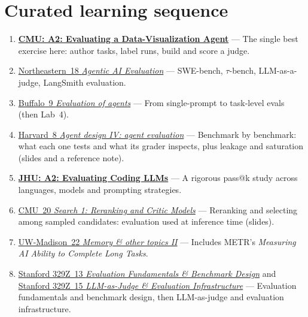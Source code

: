 \documentclass[10pt,oneside]{report}
\begin{document}
\section{Curated learning sequence}
\begin{enumerate}
\item \hyperlink{asg-CMU-2}{\textbf{CMU: A2: Evaluating a Data-Visualization Agent}} --- The single best exercise here: author tasks, label runs, build and score a judge.
\item \hyperlink{lec-NEU-18}{Northeastern~18 \emph{Agentic AI Evaluation}} --- SWE-bench, $\tau$-bench, LLM-as-a-judge, LangSmith evaluation.
\item \hyperlink{lec-UB-9}{Buffalo~9 \emph{Evaluation of agents}} --- From single-prompt to task-level evals (then Lab~4).
\item \hyperlink{lec-HARV-8}{Harvard~8 \emph{Agent design IV: agent evaluation}} --- Benchmark by benchmark: what each one tests and what its grader inspects, plus leakage and saturation (slides and a reference note).
\item \hyperlink{asg-JHU-2}{\textbf{JHU: A2: Evaluating Coding LLMs}} --- A rigorous pass@k study across languages, models and prompting strategies.
\item \hyperlink{lec-CMU-20}{CMU~20 \emph{Search 1: Reranking and Critic Models}} --- Reranking and selecting among sampled candidates: evaluation used at inference time (slides).
\item \hyperlink{lec-UW-22}{UW-Madison~22 \emph{Memory \& other topics II}} --- Includes METR's \emph{Measuring AI Ability to Complete Long Tasks}.
\item \hyperlink{lec-S329Z-13}{Stanford 329Z~13 \emph{Evaluation Fundamentals \& Benchmark Design}} and \hyperlink{lec-S329Z-15}{Stanford 329Z~15 \emph{LLM-as-Judge \& Evaluation Infrastructure}} --- Evaluation fundamentals and benchmark design, then LLM-as-judge and evaluation infrastructure.
\end{enumerate}
\end{document}
